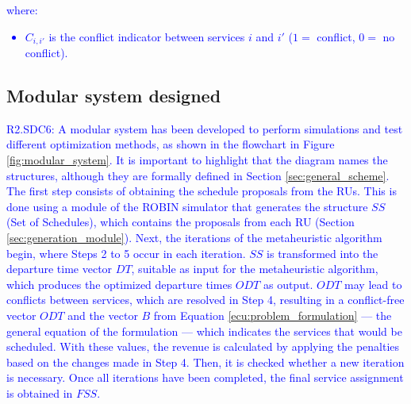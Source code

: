 \documentclass[Afour,sagev,times]{sagej}
\newcommand{\primero}[1]{\textcolor{blue}{#1}}
\newcommand{\segundo}[1]{\textcolor{blue}{#1}}
\begin{document}
\primero{
where:
\begin{itemize}
  \item $C_{i,i'}$ is the conflict indicator between services $i$ and $i'$ ($1=$ conflict, $0=$ no conflict).
\end{itemize}
}

\subsection{Modular system designed}
\label{sec:modular_system_designed}

\segundo{R2.SDC6: A modular system has been developed to perform simulations and test different optimization methods, as shown in the flowchart in Figure \ref{fig:modular_system}. It is important to highlight that the diagram names the structures, although they are formally defined in Section \ref{sec:general_scheme}. The first step consists of obtaining the schedule proposals from the RUs. This is done using a module of the ROBIN simulator that generates the structure $SS$ (Set of Schedules), which contains the proposals from each \gls{RU} (Section \ref{sec:generation_module}). Next, the iterations of the metaheuristic algorithm begin, where Steps 2 to 5 occur in each iteration. $SS$ is transformed into the departure time vector $DT$, suitable as input for the metaheuristic algorithm, which produces the optimized departure times $ODT$ as output. $ODT$ may lead to conflicts between services, which are resolved in Step 4, resulting in a conflict-free vector $ODT$ and the vector $B$ from Equation \ref{ecu:problem_formulation} — the general equation of the formulation — which indicates the services that would be scheduled. With these values, the revenue is calculated by applying the penalties based on the changes made in Step 4. Then, it is checked whether a new iteration is necessary. Once all iterations have been completed, the final service assignment is obtained in $FSS$.}

\end{document}
